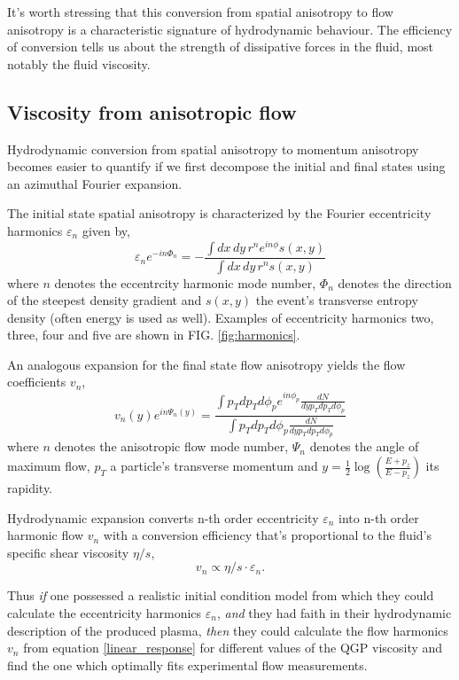 \documentclass[aps,prc,reprint,amsmath,nofootinbib]{revtex4-1}
\begin{document}
It's worth stressing that this conversion from spatial anisotropy to flow anisotropy is a characteristic signature of hydrodynamic behaviour. The efficiency of conversion
tells us about the strength of dissipative forces in the fluid, most notably the fluid viscosity.

\subsection{Viscosity from anisotropic flow}

Hydrodynamic conversion from spatial anisotropy to momentum anisotropy becomes easier to quantify if we first decompose the initial and final states using an azimuthal 
Fourier expansion. 

The initial state spatial anisotropy is characterized by the Fourier eccentricity harmonics $\varepsilon_n$ given by,
\begin{equation}
 \varepsilon_n e^{-i n \Phi_n} = -\frac{\int dx\,dy\,r^n e^{i n \phi} s(x,y)}{\int dx\,dy\, r^n s(x,y)}
\end{equation}
where $n$ denotes the eccentrcity harmonic mode number, $\Phi_n$ denotes the direction of the steepest density gradient and $s(x,y)$ the event's transverse entropy density
(often energy is used as well). Examples of eccentricity harmonics two, three, four and five are shown in FIG. \ref{fig:harmonics}.

An analogous expansion for the final state flow anisotropy yields the flow coefficients $v_n$,
\begin{equation}
 v_n(y) e^{i n \Psi_n(y)} = \frac{\int p_T dp_T d\phi_p e^{i n \phi_p} \frac{dN}{dy p_T dp_T d\phi_p}}{\int p_T dp_T d\phi_p \frac{dN}{dy p_T dp_T d\phi_p}}
\end{equation}
where $n$ denotes the anisotropic flow mode number, $\Psi_n$ denotes the angle of maximum flow, $p_T$ a particle's transverse momentum and 
$y=\tfrac{1}{2}\log(\tfrac{E+p_z}{E-p_z})$ its rapidity.

Hydrodynamic expansion converts n-th order eccentricity $\varepsilon_n$ into n-th order harmonic flow $v_n$ with a conversion efficiency that's proportional to the fluid's
specific shear viscosity $\eta/s$,
\begin{equation}
 \label{linear_response}
 v_n \propto \eta/s \cdot \varepsilon_n.
\end{equation}

Thus \emph{if} one possessed a realistic initial condition model from which they could calculate the eccentricity harmonics $\varepsilon_n$, \emph{and} they had faith 
in their hydrodynamic description of the produced plasma, \emph{then} they could calculate the flow harmonics $v_n$ from equation \ref{linear_response} for different values 
of the QGP viscosity and find the one which optimally fits experimental flow measurements.
\end{document}
